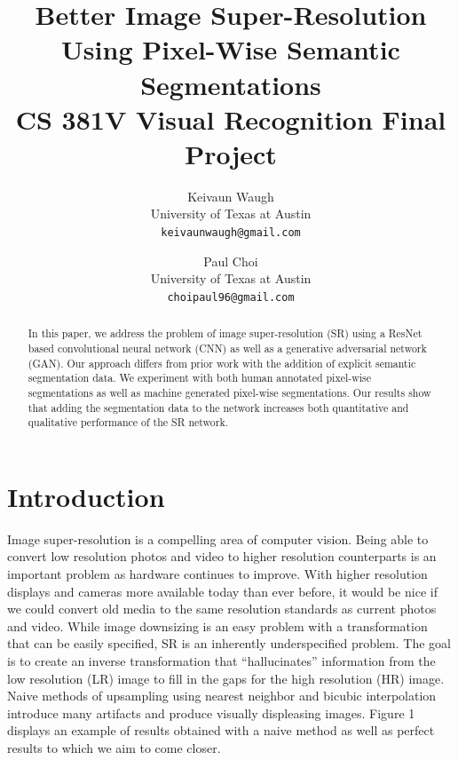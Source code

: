 \documentclass[10pt,twocolumn,letterpaper]{article}
\begin{document}
\title{
    Better Image Super-Resolution Using Pixel-Wise Semantic Segmentations \\
    \large CS 381V Visual Recognition Final Project}

\author{Keivaun Waugh\\
University of Texas at Austin\\
{\tt\small keivaunwaugh@gmail.com}
\and
Paul Choi\\
University of Texas at Austin\\
{\tt\small choipaul96@gmail.com}
}

\maketitle

\begin{abstract}
In this paper, we address the problem of image super-resolution (SR) using
a ResNet based convolutional neural network (CNN) as well as a generative
adversarial network (GAN). Our approach differs from prior work with the
addition of explicit semantic segmentation data. We experiment with both
human annotated pixel-wise segmentations as well as machine generated
pixel-wise segmentations. Our results show that adding the segmentation
data to the network increases both quantitative and qualitative performance
of the SR network.
\end{abstract}

\section{Introduction}
Image super-resolution is a compelling area of computer vision. Being able to
convert low resolution photos and video to higher resolution counterparts is an
important problem as hardware continues to improve. With higher resolution
displays and cameras more available today than ever before, it would be nice if
we could convert old media to the same resolution standards as current photos
and video. While image downsizing is an easy problem with a transformation that
can be easily specified, SR is an inherently underspecified problem. The goal
is to create an inverse transformation that ``hallucinates'' information from
the low resolution (LR) image to fill in the gaps for the high resolution (HR)
image. Naive methods of upsampling using nearest neighbor and bicubic
interpolation introduce many artifacts and produce visually displeasing images.
Figure 1 displays an example of results obtained with a naive method as well as
perfect results to which we aim to come closer.
\end{document}
